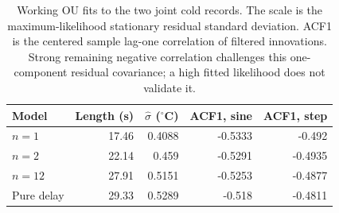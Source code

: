 \begin{table}[tbp]
\centering
\small
\begin{tabular}{lrrrr}
\toprule
Model & Length (s) & $\hat\sigma$ (${}^\circ$C) & ACF1, sine & ACF1, step \\
\midrule
$n=1$ & 17.46 & 0.4088 & -0.5333 & -0.492 \\
$n=2$ & 22.14 & 0.459 & -0.5291 & -0.4935 \\
$n=12$ & 27.91 & 0.5151 & -0.5253 & -0.4877 \\
Pure delay & 29.33 & 0.5289 & -0.518 & -0.4811 \\
\bottomrule
\end{tabular}
\caption{Working OU fits to the two joint cold records. The scale is the maximum-likelihood stationary residual standard deviation. ACF1 is the centered sample lag-one correlation of filtered innovations. Strong remaining negative correlation challenges this one-component residual covariance; a high fitted likelihood does not validate it.}
\label{tab:ou-diagnostics}
\end{table}

